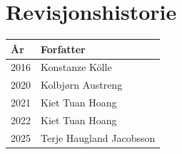
\section*{Revisjonshistorie}
\begin{center}
 \begin{tabular}{|p{1.5cm} p{5.5cm}|} 
 \hline
 År & Forfatter \\ [0.5ex] 
 \hline\hline
 2016 & Konstanze Kölle  \\ 
 \hline
 2020 & Kolbjørn Austreng  \\ 
 \hline
 2021 & Kiet Tuan Hoang \\
 \hline
 2022 & Kiet Tuan Hoang \\
 \hline
 2025 & Terje Haugland Jacobsson \\
 \hline
\end{tabular}
\end{center}


